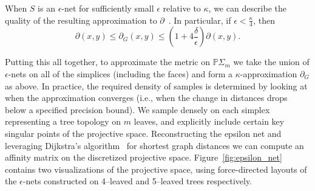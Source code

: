 \documentclass[a4paper,11pt]{article}
\begin{document}
When $S$ is an $\epsilon$-net for sufficiently small $\epsilon$ relative to $\kappa$, we can describe the quality of the resulting approximation to $\partial$~\cite[Thm. 2]{bernstein2000graph}.
In particular, if $\epsilon < \frac{\kappa}{4}$, then 
\[
\partial(x,y) \leq \partial_G(x,y) \leq (1 + 4\frac{\delta}{\epsilon}) \partial(x,y).
\]

Putting this all together, to approximate the metric on $\mathbb{P}\Sigma_m$ we take the union of $\epsilon$-nets on all of the simplices (including the faces) and form a $\kappa$-approximation $\partial_G$ as above.
In practice, the required density of samples is determined by looking at when the approximation converges (i.e., when the change in distances drops below a specified precision bound).
We sample densely on each simplex representing a tree topology on $m$ leaves, and explicitly include certain key singular points of the projective space.
Reconstructing the epsilon net and leveraging Dijkstra's algorithm~\cite{dijkstra1959note} for shortest graph distances we can compute an affinity matrix on the discretized projective space.
Figure~\ref{fig:epsilon_net} contains two visualizations of the projective space, using force-directed layouts of the $\epsilon$-nets constructed on 4--leaved and 5--leaved trees respectively.
\end{document}
